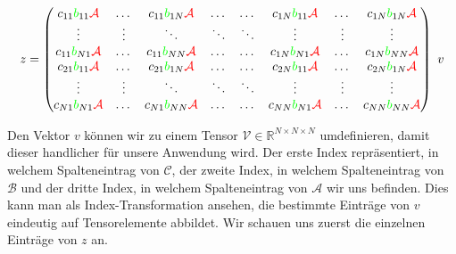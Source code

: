 \begin{equation} \label{eq:matrix} z=
\begin{pmatrix}
c_{11} \textcolor{green}{b}_{11} \textcolor{red}{\mathcal{A}} & \dots  & c_{11} \textcolor{green}{b}_{1N} \textcolor{red}{\mathcal{A}} & \dots & \dots & c_{1N}\textcolor{green}{b}_{11}\textcolor{red}{\mathcal{A}} & \dots & c_{1N}\textcolor{green}{b}_{1N}\textcolor{red}{\mathcal{A}}  \\

\vdots & \vdots & \ddots & \ddots  & \ddots & \vdots & \vdots & \vdots \\
c_{11} \textcolor{green}{b}_{N 1} \textcolor{red}{\mathcal{A}} & \dots  & c_{11} \textcolor{green}{b}_{N N} \textcolor{red}{\mathcal{A}} & \dots & \dots & c_{1 N}\textcolor{green}{b}_{N 1}\textcolor{red}{\mathcal{A}} & \dots & c_{1 N}\textcolor{green}{b}_{N N}\textcolor{red}{\mathcal{A}}  \\
c_{21} \textcolor{green}{b}_{11} \textcolor{red}{\mathcal{A}} & \dots  & c_{21} \textcolor{green}{b}_{1N} \textcolor{red}{\mathcal{A}} & \dots & \dots & c_{2N}\textcolor{green}{b}_{11}\textcolor{red}{\mathcal{A}} & \dots & c_{2 N}\textcolor{green}{b}_{1 N}\textcolor{red}{\mathcal{A}}  \\
\vdots & \vdots & \ddots & \ddots  & \ddots & \vdots & \vdots & \vdots \\
c_{N 1} \textcolor{green}{b}_{N 1} \textcolor{red}{\mathcal{A}} & \dots  & c_{N 1} \textcolor{green}{b}_{N N} \textcolor{red}{\mathcal{A}} & \dots & \dots & c_{N N}\textcolor{green}{b}_{N 1}\textcolor{red}{\mathcal{A}} & \dots & c_{N N}\textcolor{green}{b}_{N N}\textcolor{red}{\mathcal{A}}  \\
\end{pmatrix} \, \, v
\end{equation}

Den Vektor $v$ können wir zu einem Tensor $\mathcal{V} \in \mathbb{R}^{N \times N \times N} $ umdefinieren, damit dieser handlicher für unsere Anwendung wird. Der erste Index repräsentiert, in welchem Spalteneintrag von $\mathcal{C}$, der zweite Index, in welchem Spalteneintrag von $\mathcal{B}$ und der dritte Index, in welchem Spalteneintrag von $\mathcal{A}$ wir uns befinden. Dies kann man als Index-Transformation ansehen, die bestimmte Einträge von $v$ eindeutig auf Tensorelemente abbildet. 
Wir schauen uns zuerst die einzelnen Einträge von $z$ an. 

